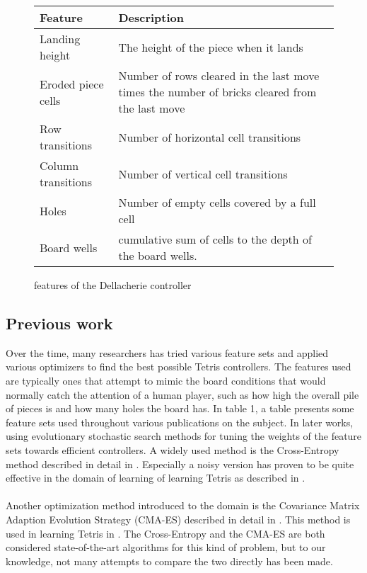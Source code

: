 \begin{figure}[h!]
\begin{center}
\begin{tabular}{| l | p{8cm} |}
\hline
\textbf{Feature} & \textbf{Description}\\
\hline
Landing height & The height of the piece when it lands\\
\hline
Eroded piece cells & Number of rows cleared in the last move
times the number of bricks cleared from the last move\\
\hline
Row transitions & Number of horizontal cell transitions\\
\hline
Column transitions & Number of vertical cell transitions \\
\hline
Holes & Number of empty cells covered by a full cell\\
\hline
Board wells & cumulative sum of cells to the depth of
the board wells.\\
\hline
\end{tabular}
\end{center}
\caption{features of the Dellacherie controller \label{table:dellfeat}}
\end{figure}


\subsection{Previous work}

Over the time, many researchers has tried various feature 
sets and applied various optimizers to find the best 
possible Tetris controllers. The features used are typically
ones that attempt to mimic the board conditions that would
normally catch the attention of a human player, such as
how high the overall pile of pieces is and how many holes 
the board has. In \cite{scherrer2009:b} table 1, a table 
presents some feature sets used throughout various publications
on the subject. In later works, using evolutionary stochastic 
search methods for tuning the weights of the feature sets towards
efficient controllers. A widely used method is the 
Cross-Entropy method described in detail in \citep{cetut2014}. 
Especially a noisy version has proven to be quite effective in the
domain of learning of learning Tetris as 
described in \cite{szita:06}.\\
\\
Another optimization
method introduced to the domain  is the Covariance Matrix
Adaption Evolution Strategy (CMA-ES) described in detail in 
\cite{hansen2011}. This method is used in learning Tetris in 
\cite{boumaza2011:a}. The Cross-Entropy and the CMA-ES are
both considered state-of-the-art algorithms for this kind 
of problem, but to our knowledge, not many attempts to 
compare the two directly has been made.

